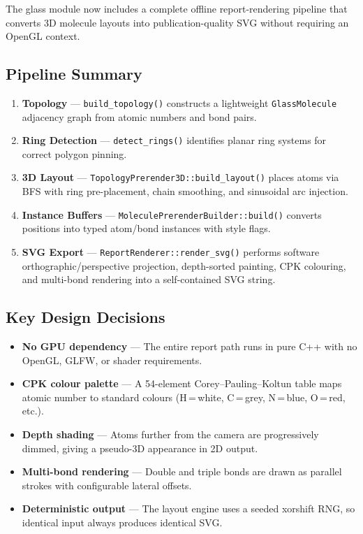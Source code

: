 ﻿\documentclass[11pt]{article}
\begin{document}
The glass module now includes a complete offline report-rendering pipeline
that converts 3D molecule layouts into publication-quality SVG without
requiring an OpenGL context.

\subsection{Pipeline Summary}

\begin{enumerate}
  \item \textbf{Topology} --- \texttt{build\_topology()} constructs a
        lightweight \texttt{GlassMolecule} adjacency graph from atomic
        numbers and bond pairs.
  \item \textbf{Ring Detection} --- \texttt{detect\_rings()} identifies
        planar ring systems for correct polygon pinning.
  \item \textbf{3D Layout} --- \texttt{TopologyPrerender3D::build\_layout()}
        places atoms via BFS with ring pre-placement, chain smoothing, and
        sinusoidal arc injection.
  \item \textbf{Instance Buffers} --- \texttt{MoleculePrerenderBuilder::build()}
        converts positions into typed atom/bond instances with style flags.
  \item \textbf{SVG Export} --- \texttt{ReportRenderer::render\_svg()} performs
        software orthographic/perspective projection, depth-sorted painting,
        CPK colouring, and multi-bond rendering into a self-contained SVG string.
\end{enumerate}

\subsection{Key Design Decisions}

\begin{itemize}
  \item \textbf{No GPU dependency} --- The entire report path runs in pure C++
        with no OpenGL, GLFW, or shader requirements.
  \item \textbf{CPK colour palette} --- A 54-element Corey--Pauling--Koltun
        table maps atomic number to standard colours (H\,=\,white, C\,=\,grey,
        N\,=\,blue, O\,=\,red, etc.).
  \item \textbf{Depth shading} --- Atoms further from the camera are
        progressively dimmed, giving a pseudo-3D appearance in 2D output.
  \item \textbf{Multi-bond rendering} --- Double and triple bonds are drawn as
        parallel strokes with configurable lateral offsets.
  \item \textbf{Deterministic output} --- The layout engine uses a seeded
        xorshift RNG, so identical input always produces identical SVG.
\end{itemize}
\end{document}
